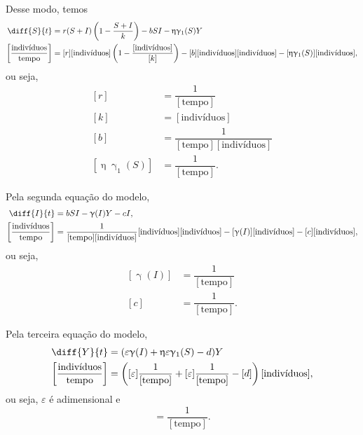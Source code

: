 \documentclass{article}
\begin{document}
Desse modo, temos
\begin{equation*}
\begin{split}
    \diff{S}{t} & = r(S+I) \left( 1 - \dfrac{S+I}{k} \right) - bSI - \upeta \upgamma_1(S)Y \\
    \left[ \dfrac{\text{indivíduos}}{\text{tempo}} \right] & = [r] \text{[indivíduos]} \left( 1 - \dfrac{\text{[indivíduos]}}{[k]} \right) - [b] \text{[indivíduos]} \text{[indivíduos]} - [\upeta \upgamma_1(S)] \text{[indivíduos]},
\end{split}
\end{equation*}
ou seja,
\begin{equation*}
\begin{split}
    [r] & =  \dfrac{1}{[\text{tempo}]}  \\
    [k] & = [\text{indivíduos}] \\
    [b] & = \dfrac{1}{[\text{tempo}] [\text{indivíduos}]} \\
    [\upeta \upgamma_1(S)] & = \dfrac{1}{[\text{tempo}]}.
\end{split}
\end{equation*}

Pela segunda equação do modelo,
\begin{equation*}
\begin{split}
    \diff{I}{t} & = bSI - \upgamma(I)Y - cI, \\
    \left[ \dfrac{\text{indivíduos}}{\text{tempo}} \right] & = \dfrac{1}{[\text{tempo}] [\text{indivíduos}]} \text{[indivíduos]} \text{[indivíduos]}- [\upgamma(I)] [\text{indivíduos}] - [c] [\text{indivíduos}],
\end{split}
\end{equation*}
ou seja,
\begin{equation*}
\begin{split}
    [\upgamma(I)] & = \dfrac{1}{[\text{tempo}]} \\
    [c] & = \dfrac{1}{[\text{tempo}]}.
\end{split}
\end{equation*}

Pela terceira equação do modelo,
\begin{equation*}
\begin{split}
    \diff{Y}{t} & = (\varepsilon \upgamma(I) + \upeta \varepsilon \upgamma_1(S) - d)Y \\
    \left[ \dfrac{\text{indivíduos}}{\text{tempo}} \right] & = \left([\varepsilon] \dfrac{1}{[\text{tempo}]} + [\varepsilon] \dfrac{1}{[\text{tempo}]} - [d] \right)[\text{indivíduos}],
\end{split}
\end{equation*}
ou seja, $\varepsilon$ é adimensional e 
\begin{equation*}
    [d] = \dfrac{1}{[\text{tempo}]}.
\end{equation*}
\end{document}
